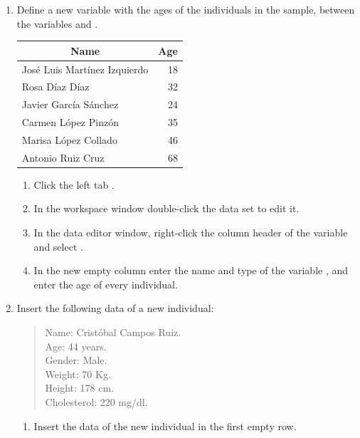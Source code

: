 \begin{enumerate}[leftmargin=*]
\item Define a new variable  with the ages of the individuals in the sample, between the variables
 and .
\begin{center}
\begin{tabular}{|l|r|}
\hline
\multicolumn{1}{|c|}{Name} & \multicolumn{1}{c|}{Age} \\
\hline
José Luis Martínez Izquierdo & 18 \\
Rosa Díaz Díaz & 32 \\
Javier García Sánchez & 24 \\
Carmen López Pinzón & 35 \\
Marisa López Collado & 46 \\
Antonio Ruiz Cruz & 68 \\
\hline
\end{tabular}
\end{center}

\begin{indication} 
\begin{enumerate}
\item Click the left tab .
\item In the workspace window double-click the data set  to edit it.
\item In the data editor window, right-click the column header of the variable  and select
. 
\item In the new empty column enter the name and type of the variable , and enter the age of every
individual.
\end{enumerate}
\end{indication}

\item Insert the following data of a new individual:
\begin{quote}
Name: Cristóbal Campos Ruiz.\\
Age: 44 years.\\
Gender: Male.\\
Weight: 70 Kg.\\
Height: 178 cm.\\
Cholesterol: 220 mg/dl.
\end{quote}

\begin{indication}
\begin{enumerate}
\item Insert the data of the new individual in the first empty row.
\end{enumerate}
\end{indication}


\end{enumerate}
